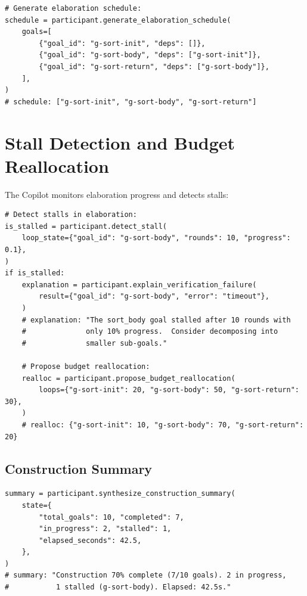 \documentclass[11pt]{article}
\begin{document}
\begin{lstlisting}[style=jugeo-python]
# Generate elaboration schedule:
schedule = participant.generate_elaboration_schedule(
    goals=[
        {"goal_id": "g-sort-init", "deps": []},
        {"goal_id": "g-sort-body", "deps": ["g-sort-init"]},
        {"goal_id": "g-sort-return", "deps": ["g-sort-body"]},
    ],
)
# schedule: ["g-sort-init", "g-sort-body", "g-sort-return"]
\end{lstlisting}

\section{Stall Detection and Budget Reallocation}\label{sec:stall}

The Copilot monitors elaboration progress and detects stalls:

\begin{lstlisting}[style=jugeo-python]
# Detect stalls in elaboration:
is_stalled = participant.detect_stall(
    loop_state={"goal_id": "g-sort-body", "rounds": 10, "progress": 0.1},
)
if is_stalled:
    explanation = participant.explain_verification_failure(
        result={"goal_id": "g-sort-body", "error": "timeout"},
    )
    # explanation: "The sort_body goal stalled after 10 rounds with
    #              only 10% progress.  Consider decomposing into
    #              smaller sub-goals."

    # Propose budget reallocation:
    realloc = participant.propose_budget_reallocation(
        loops={"g-sort-init": 20, "g-sort-body": 50, "g-sort-return": 30},
    )
    # realloc: {"g-sort-init": 10, "g-sort-body": 70, "g-sort-return": 20}
\end{lstlisting}

\subsection{Construction Summary}

\begin{lstlisting}[style=jugeo-python]
summary = participant.synthesize_construction_summary(
    state={
        "total_goals": 10, "completed": 7,
        "in_progress": 2, "stalled": 1,
        "elapsed_seconds": 42.5,
    },
)
# summary: "Construction 70% complete (7/10 goals). 2 in progress,
#           1 stalled (g-sort-body). Elapsed: 42.5s."
\end{lstlisting}
\end{document}
